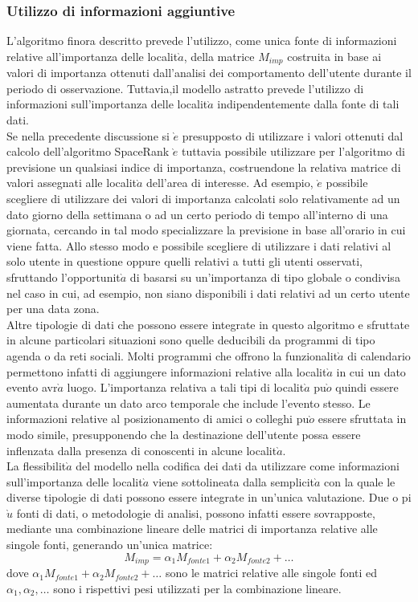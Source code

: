 \subsubsection{Utilizzo di informazioni aggiuntive}
L'algoritmo finora descritto prevede l'utilizzo, come unica fonte di informazioni
relative all'importanza delle localit$\grave{a}$, della matrice $M_{imp}$ costruita in base ai
valori di importanza ottenuti dall'analisi dei comportamento dell'utente durante
il periodo di osservazione. Tuttavia,il modello astratto prevede l'utilizzo
di informazioni sull'importanza delle localit$\grave{a}$ indipendentemente dalla fonte di
tali dati.\\
Se nella precedente discussione si $\grave{e}$ presupposto di utilizzare i valori ottenuti
dal calcolo dell'algoritmo SpaceRank $\grave{e}$ tuttavia possibile utilizzare per
l'algoritmo di previsione un qualsiasi indice di importanza, costruendone la
relativa matrice di valori assegnati alle localit$\grave{a}$ dell'area di interesse. Ad esempio,
$\grave{e}$ possibile scegliere di utilizzare dei valori di importanza calcolati solo
relativamente ad un dato giorno della settimana o ad un certo periodo di tempo
all'interno di una giornata, cercando in tal modo specializzare la previsione
in base all'orario in cui viene fatta. Allo stesso modo e possibile scegliere di
utilizzare i dati relativi al solo utente in questione oppure quelli relativi a tutti
gli utenti osservati, sfruttando l'opportunit$\grave{a}$ di basarsi su un'importanza di
tipo globale o condivisa nel caso in cui, ad esempio, non siano disponibili i
dati relativi ad un certo utente per una data zona.\\
Altre tipologie di dati che possono essere integrate in questo algoritmo e
sfruttate in alcune particolari situazioni sono quelle deducibili da programmi
di tipo agenda o da reti sociali. Molti programmi che offrono la funzionalit$\grave{a}$ di
calendario permettono infatti di aggiungere informazioni relative alla localit$\grave{a}$ in
cui un dato evento avr$\grave{a}$ luogo. L'importanza relativa a tali tipi di localit$\grave{a}$ pu$\grave{o}$
quindi essere aumentata durante un dato arco temporale che include l'evento
stesso. Le informazioni relative al posizionamento di amici o colleghi pu$\grave{o}$ essere
sfruttata in modo simile, presupponendo che la destinazione dell'utente possa
essere inflenzata dalla presenza di conoscenti in alcune localit$\grave{a}$.\\
La flessibilit$\grave{a}$ del modello nella codifica dei dati da utilizzare come informazioni
sull'importanza delle localit$\grave{a}$ viene sottolineata dalla semplicit$\grave{a}$ con
la quale le diverse tipologie di dati possono essere integrate in un'unica valutazione.
Due o pi$\grave{u}$ fonti di dati, o metodologie di analisi, possono infatti essere
sovrapposte, mediante una combinazione lineare delle matrici di importanza
relative alle singole fonti, generando un'unica matrice:
\begin{equation}
M_{imp} = \alpha_{1}M_{fonte1} + \alpha_{2}M_{fonte2} + \dots
\end{equation}
dove $\alpha_{1}M_{fonte1} + \alpha_{2}M_{fonte2} + \dots$ sono le matrici relative
alle singole fonti ed $\alpha_{1},\alpha_{2},\dots$
sono i rispettivi pesi utilizzati per la combinazione lineare.
